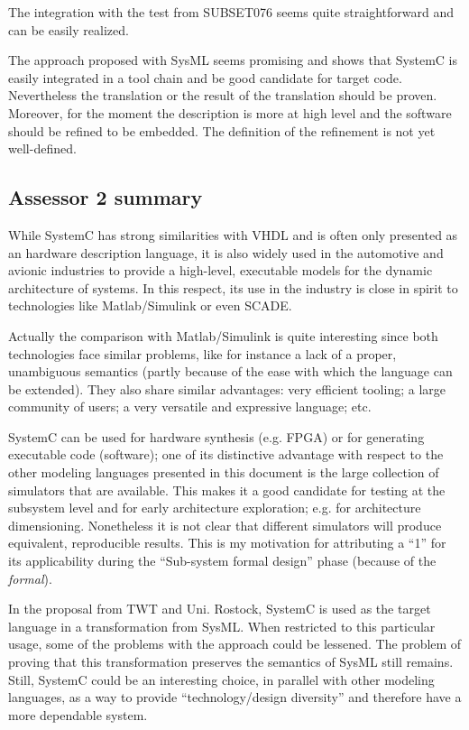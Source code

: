 The integration with the test from SUBSET076 seems quite straightforward
and can be easily realized. 

The approach proposed with SysML seems promising and shows that
SystemC is easily integrated in a tool chain and be good candidate for
target code. Nevertheless the translation or the result of the
translation should be proven. Moreover, for the moment the description
is more at high level and the software should be refined to be
embedded. The definition of the refinement is not yet well-defined.

\subsection{Assessor 2 summary}
\label{sec:assessor-2-summary}

While SystemC has strong similarities with VHDL and is often only
presented as an hardware description language, it is also widely used
in the automotive and avionic industries to provide a high-level,
executable models for the dynamic architecture of systems. In this
respect, its use in the industry is close in spirit to technologies
like Matlab/Simulink or even SCADE.

Actually the comparison with Matlab/Simulink is quite interesting
since both technologies face similar problems, like for instance a
lack of a proper, unambiguous semantics (partly because of the ease
with which the language can be extended). They also share similar
advantages: very efficient tooling; a large community of users; a very
versatile and expressive language; etc.

SystemC can be used for hardware synthesis (e.g. FPGA) or for
generating executable code (software); one of its distinctive
advantage with respect to the other modeling languages presented in
this document is the large collection of simulators that are
available. This makes it a good candidate for testing at the subsystem
level and for early architecture exploration; e.g. for architecture
dimensioning. Nonetheless it is not clear that different simulators
will produce equivalent, reproducible results. This is my motivation
for attributing a ``1'' for its applicability during the ``Sub-system
formal design'' phase (because of the \emph{formal}).

In the proposal from TWT and Uni. Rostock, SystemC is used as the
target language in a transformation from SysML. When restricted to
this particular usage, some of the problems with the approach could be
lessened. The problem of proving that this transformation preserves
the semantics of SysML still remains. Still, SystemC could be an
interesting choice, in parallel with other modeling languages, as a
way to provide ``technology/design diversity'' and therefore have a
more dependable system.


